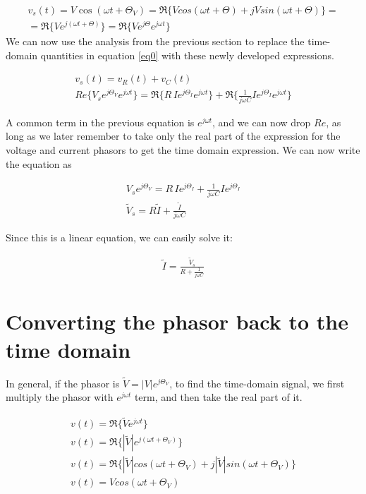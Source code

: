 \documentclass{ximera}
\begin{document}
\begin{eqnarray}
v_s(t)=  V \cos (\omega t + \Theta_V)=\Re\{ V cos (\omega t + \Theta ) + j V sin (\omega t + \Theta)\}= \nonumber \\ 
= \Re\{V e^{j(\omega t + \Theta)}\}=\Re\{V e^{j \Theta} e^{j \omega t}\} \label{eq2}
\end{eqnarray}
We can now use the analysis from the previous section to  replace the time-domain quantities in equation \ref{eq0} with
these newly developed expressions.



\begin{eqnarray}
v_s(t)=v_R(t) + v_C(t)  \\
Re\{V_s e^{j \Theta_V} e^{j \omega t}\}=    \Re\{R \, I e^{j \Theta_I} e^{j \omega t}\}   +  \Re\{   \frac{1}{j \omega C}  I e^{j \Theta_I}  e^{j \omega t}  \}
\end{eqnarray}

A common term in the previous equation is $ e^{j\omega t}$, and we can now drop $Re$, as long as we later remember to take only the real part of the expression for the voltage and current phasors to get the time domain expression. We can now
write the equation as




\begin{eqnarray}
 V_s  e^{j \Theta_{V}}  =R \, I e^{j \Theta_I}  +    \frac{1}{j \omega C}  I e^{j \Theta_I}  \\
\tilde{V}_s  = R \tilde{I}    + \frac{\tilde{I}}{j \omega C} 
\end{eqnarray}



Since this is a linear equation, we can easily solve it:


\begin{eqnarray}
\tilde{I}  = \frac{\tilde{V}_s}{ R    + \frac{1}{j \omega C} } \label{pheq}
\end{eqnarray} 




\section{Converting the phasor back to the time domain}


In general, if the phasor is  $\tilde{V}=|V| e^{j \Theta_V}$, to find the time-domain signal, we first multiply the phasor with $e^{j \omega t}$ term, and then take the real part of it. 

\begin{eqnarray}
v(t)=\Re \{ \tilde{V} e^{j \omega t} \} \\
v(t)=\Re\{|\tilde{V}| e^{j(\omega t + \Theta_V)}\} \\
v(t)=\Re\{ |\tilde{V}| cos (\omega t + \Theta_V ) + j  |\tilde{V}|  sin (\omega t + \Theta_V)\} \\
v(t) = V cos (\omega t + \Theta_V )
\end{eqnarray}
\end{document}
